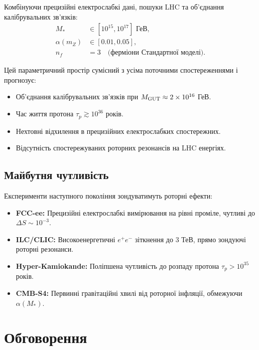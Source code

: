 \documentclass[11pt,a4paper]{article}
\numberwithin{equation}{section}
\theoremstyle{plain}
\theoremstyle{definition}
\theoremstyle{remark}
\begin{document}
Комбінуючи прецизійні електрослабкі дані, пошуки LHC та об'єднання калібрувальних зв'язків:
\begin{align}
M_* &\in [10^{15}, 10^{17}]\text{ ГеВ}, \label{eq:M-star-allowed}\\
\alpha(m_Z) &\in [0{.}01, 0{.}05], \label{eq:alpha-allowed}\\
n_f &= 3 \quad\text{(ферміони Стандартної моделі)}.
\label{eq:nf-allowed}
\end{align}

Цей параметричний простір сумісний з усіма поточними спостереженнями і прогнозує:
\begin{itemize}
  \item Об'єднання калібрувальних зв'язків при $M_{\rm GUT}\approx 2\times 10^{16}$ ГеВ.
  \item Час життя протона $\tau_p \gtrsim 10^{36}$ років.
  \item Нехтовні відхилення в прецизійних електрослабких спостережних.
  \item Відсутність спостережуваних роторних резонансів на LHC енергіях.
\end{itemize}

\subsection{Майбутня чутливість}

Експерименти наступного покоління зондуватимуть роторні ефекти:
\begin{itemize}
  \item \textbf{FCC-ee:} Прецизійні електрослабкі вимірювання на рівні проміле, чутливі до $\Delta S\sim 10^{-3}$.
  \item \textbf{ILC/CLIC:} Високоенергетичні $e^+e^-$ зіткнення до 3 ТеВ, прямо зондуючі роторні резонанси.
  \item \textbf{Hyper-Kamiokande:} Поліпшена чутливість до розпаду протона $\tau_p > 10^{35}$ років.
  \item \textbf{CMB-S4:} Первинні гравітаційні хвилі від роторної інфляції, обмежуючи $\alpha(M_*)$.
\end{itemize}

\vspace{1em}

\section{Обговорення}\label{sec:discussion}
\end{document}
